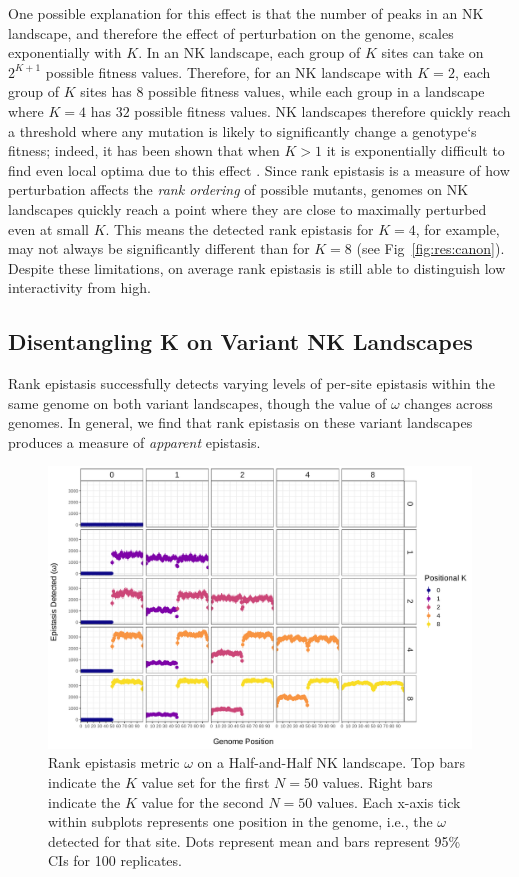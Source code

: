One possible explanation for this effect is that the number of peaks in an NK landscape, and therefore the effect of perturbation on the genome, scales exponentially with $K$. In an NK landscape, each group of $K$ sites can take on $2^{K+1}$ possible fitness values. Therefore, for an NK landscape with $K=2$, each group of $K$ sites has $8$ possible fitness values, while each group in a landscape where $K=4$ has $32$ possible fitness values. NK landscapes therefore quickly reach a threshold where any mutation is likely to significantly change a genotype`s fitness; indeed, it has been shown that when $K>1$ it is exponentially difficult to find even local optima due to this effect \citep{kaznatcheev_computational_2019}.
Since rank epistasis is a measure of how perturbation affects the \textit{rank ordering} of possible mutants, genomes on NK landscapes quickly reach a point where they are close to maximally perturbed even at small $K$. This means the detected rank epistasis for $K=4$, for example, may not always be significantly different than for $K=8$ (see Fig~\ref{fig:res:canon}). Despite these limitations, on average rank epistasis is still able to distinguish low interactivity from high.

\subsection{Disentangling K on Variant NK Landscapes}

Rank epistasis successfully detects varying levels of per-site epistasis within the same genome on both variant landscapes, though the value of $\omega$ changes across genomes. In general, we find that rank epistasis on these variant landscapes produces a measure of \textit{apparent} epistasis. 

\begin{figure}
    \centering
    \includegraphics[width=\textwidth]{chapters/1-rank-epistasis/figs/summary_half.pdf}
    \caption{Rank epistasis metric $\omega$ on a Half-and-Half NK landscape. Top bars indicate the $K$ value set for the first $N=50$ values. Right bars indicate the $K$ value for the second $N=50$ values. Each x-axis tick within subplots represents one position in the genome, i.e., the $\omega$ detected for that site. Dots represent mean and bars represent 95\% CIs for 100 replicates.}
    \label{fig:res:half}
\end{figure}

